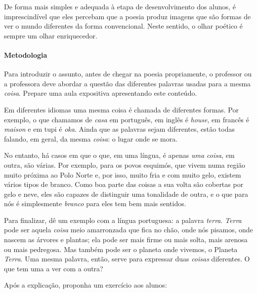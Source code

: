 \documentclass[11pt]{extarticle}
\begin{document}
De forma mais simples e adequada à etapa de desenvolvimento dos alunos,
é imprescindível que eles percebam que a poesia produz imagens 
que são formas de ver o mundo diferentes da forma convencional.
Neste sentido, o olhar poético é sempre um olhar enriquecedor. 

\paragraph{Metodologia} Para introduzir o assunto, antes de chegar na poesia
propriamente, o professor ou a professora deve abordar a questão das
diferentes palavras usadas para a mesma \textit{coisa}. 
Prepare uma aula expositiva apresentando este conteúdo. 

Em diferentes idiomas uma mesma coisa é chamada de diferentes formas.
Por exemplo, o que chamamos de \textit{casa} em português, em inglês 
é \textit{house}, em francês é \textit{maison} e em tupi é \textit{oka}. 
Ainda que as palavras sejam diferentes, estão todas falando, em geral, 
da mesma \textit{coisa}: o lugar onde se mora. 


No entanto, há casos em que o que, em uma língua, é apenas \textit{uma coisa},
em outra, são várias. Por exemplo, para os povos esquimós, que vivem
numa região muito próxima ao Polo Norte e, por isso, muito fria e com
muito gelo, existem vários tipos de branco. Como boa parte das coisas
a sua volta são cobertas por gelo e neve, eles são capazes de distinguir 
uma tonalidade de outra, e o que para nós é simplesmente \textit{branco}
para eles tem bem mais sentidos. 

Para finalizar, dê um exemplo com a língua portuguesa: a palavra \textit{terra}.
\textit{Terra} pode ser aquela \textit{coisa} meio amarronzada que fica no 
chão, onde nós pisamos, onde nascem as árvores e plantas; ela pode 
ser mais firme ou mais solta, mais arenosa ou mais pedregosa.
Mas também pode ser o planeta onde vivemos, o Planeta \textit{Terra}. 
Uma mesma palavra, então, serve para expressar duas \textit{coisas} diferentes. 
O que tem uma a ver com a outra? 


Após a explicação, proponha um exercício aos alunos:
\end{document}
